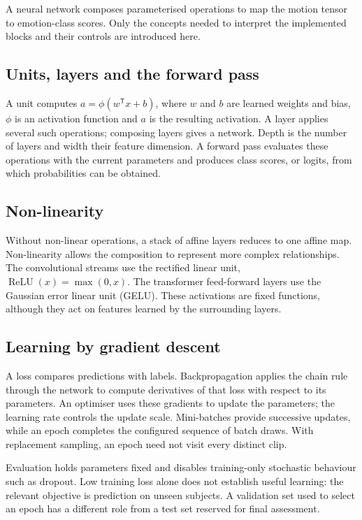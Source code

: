 A neural network composes parameterised operations to map the motion tensor to emotion-class scores. Only the concepts needed to interpret the implemented blocks and their controls are introduced here.

\subsection{Units, layers and the forward pass}
\label{sec:units-layers}

A unit computes $a=\phi(w^{\mathsf T}x+b)$, where $w$ and $b$ are learned weights and bias, $\phi$ is an activation function and $a$ is the resulting activation. A layer applies several such operations; composing layers gives a network. Depth is the number of layers and width their feature dimension. A forward pass evaluates these operations with the current parameters and produces class scores, or logits, from which probabilities can be obtained.

\subsection{Non-linearity}
\label{sec:non-linearity}

Without non-linear operations, a stack of affine layers reduces to one affine map. Non-linearity allows the composition to represent more complex relationships. The convolutional streams use the rectified linear unit, $\operatorname{ReLU}(x)=\max(0,x)$. The transformer feed-forward layers use the Gaussian error linear unit (GELU). These activations are fixed functions, although they act on features learned by the surrounding layers.

\subsection{Learning by gradient descent}
\label{sec:gradient-descent}

A loss compares predictions with labels. Backpropagation applies the chain rule through the network to compute derivatives of that loss with respect to its parameters. An optimiser uses these gradients to update the parameters; the learning rate controls the update scale. Mini-batches provide successive updates, while an epoch completes the configured sequence of batch draws. With replacement sampling, an epoch need not visit every distinct clip.

Evaluation holds parameters fixed and disables training-only stochastic behaviour such as dropout. Low training loss alone does not establish useful learning: the relevant objective is prediction on unseen subjects. A validation set used to select an epoch has a different role from a test set reserved for final assessment.

